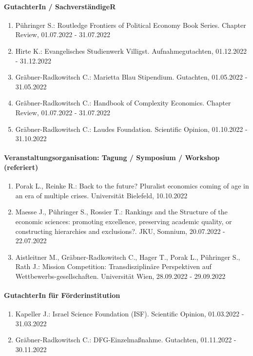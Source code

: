 \paragraph{GutachterIn / SachverständigeR}
\begin{enumerate}[leftmargin=*, labelsep=0.5cm]
\item Pühringer S.: Routledge Frontiers of Political Economy Book Series. Chapter Review, 01.07.2022 - 31.07.2022
\item Hirte K.: Evangelisches Studienwerk Villigst. Aufnahmegutachten, 01.12.2022 - 31.12.2022
\item Gräbner-Radkowitsch C.: Marietta Blau Stipendium. Gutachten, 01.05.2022 - 31.05.2022
\item Gräbner-Radkowitsch C.: Handbook of Complexity Economics. Chapter Review, 01.07.2022 - 31.07.2022
\item Gräbner-Radkowitsch C.: Laudes Foundation. Scientific Opinion, 01.10.2022 - 31.10.2022
\end{enumerate}
\paragraph{Veranstaltungsorganisation: Tagung / Symposium / Workshop (referiert)}
\begin{enumerate}[leftmargin=*, labelsep=0.5cm]
\item Porak L., Reinke R.: Back to the future? Pluralist economics coming of age in an era of multiple crises. Universität Bielefeld, 10.10.2022
\item Maesse J., Pühringer S., Rossier T.: Rankings and the Structure of the economic sciences: promoting excellence, preserving academic quality, or constructing hierarchies and exclusions?. JKU, Somnium, 20.07.2022 - 22.07.2022
\item Aistleitner M., Gräbner-Radkowitsch C., Hager T., Porak L., Pühringer S., Rath J.: Mission Competition: Transdisziplinäre Perspektiven auf Wettbewerbs-gesellschaften. Universität Wien, 28.09.2022 - 29.09.2022
\end{enumerate}
\paragraph{GutachterIn für Förderinstitution}
\begin{enumerate}[leftmargin=*, labelsep=0.5cm]
\item Kapeller J.: Israel Science Foundation (ISF). Scientific Opinion, 01.03.2022 - 31.03.2022
\item Gräbner-Radkowitsch C.: DFG-Einzelmaßnahme. Gutachten, 01.11.2022 - 30.11.2022
\end{enumerate}
